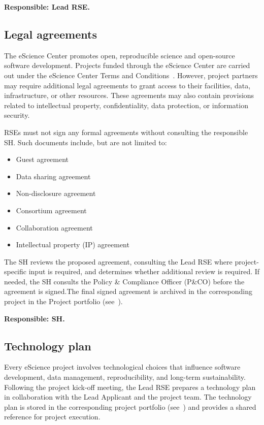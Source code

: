 \textbf{Responsible: Lead RSE.} 

\subsection{Legal agreements}
\label{sec:init:legal}
The eScience Center promotes open, reproducible science and open-source software development. Projects funded through 
the eScience Center are carried out under the eScience Center Terms and Conditions~\cite{nlesc-terms}. However, project 
partners may require additional legal agreements to grant access to their facilities, data, infrastructure, or other 
resources. These agreements may also contain provisions related to intellectual property, confidentiality, data 
protection, or information security.

RSEs must not sign any formal agreements without consulting the responsible SH. Such documents include, but are not 
limited to:
\vspace{-0.2cm}
\begin{itemize}
\item Guest agreement
\item Data sharing agreement
\item Non-disclosure agreement
\item Consortium agreement
\item Collaboration agreement
\item Intellectual property (IP) agreement
\end{itemize}
\vspace{-0.2cm}

The SH reviews the proposed agreement, consulting the Lead RSE where project-specific input is required, and determines 
whether additional review is required. If needed, the SH consults the Policy \& Compliance Officer (P\&CO) before the 
agreement is signed.The final signed agreement is archived in the corresponding project in the Project portfolio 
(see~\cite{proj-portfolio}).

\textbf{Responsible: SH.} 

\subsection{Technology plan}
\label{sec:init:techplan}
Every eScience project involves technological choices that influence software development, data management, 
reproducibility, and long-term sustainability. Following the project kick-off meeting, the Lead RSE prepares a 
technology plan in collaboration with the Lead Applicant and the project team. The technology plan is stored in the 
corresponding project portfolio (see~\cite{proj-portfolio}) and provides a shared reference for project execution.

